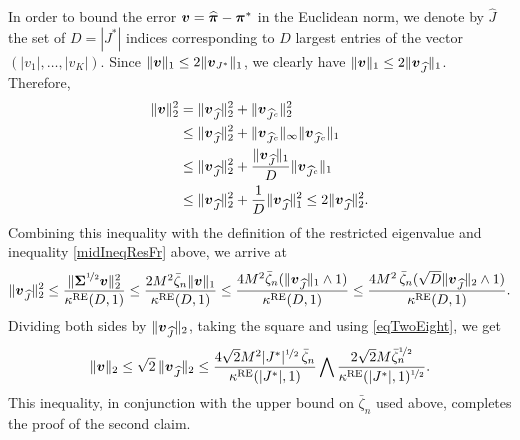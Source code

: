 In order to bound the error $\boldsymbol v=\widehat{\boldsymbol \pi}-\boldsymbol \pi^*$ in the Euclidean norm, we denote
by $\hat J $ the set of $D = |J^*|$ indices corresponding to $D$ largest entries of the
vector $(|v_1|,\ldots,|v_K|)$. Since $\|\boldsymbol v\|_1\le 2\|\boldsymbol v_{J^*}\|_1$, we clearly have
$\|\boldsymbol v\|_1\le 2\|\boldsymbol v_{\widehat J}\|_1$. Therefore,
\begin{align}
\|\boldsymbol v\|_2^2
&= \|\boldsymbol v_{\widehat J}\|_2^2+\|\boldsymbol v_{\widehat J^c}\|_2^2\\
&\le \|\boldsymbol v_{\widehat J}\|_2^2+\|\boldsymbol v_{\widehat J^c}\|_\infty\|\boldsymbol v_{\widehat J^c}\|_1\\
&\le \|\boldsymbol v_{\widehat J}\|_2^2+\frac{\|\boldsymbol v_{\widehat J}\|_1}{D}\|\boldsymbol v_{\widehat J^c}\|_1\\
&\le \|\boldsymbol v_{\widehat J}\|_2^2+\frac{1}{D}\|\boldsymbol v_{\widehat J}\|_1^2\le 2\|\boldsymbol v_{\widehat J}\|_2^2
\label{eqTwoEight}.
\end{align}
Combining this inequality with the definition of the restricted eigenvalue and
inequality \eqref{midIneqResFr} above, we arrive at
\begin{align}
\|\boldsymbol v_{\widehat J}\|_2^2\le \frac{\|\boldsymbol\Sigma^{\nicefrac12}\boldsymbol v\|_2^2}{\kappa^{\rm RE}(D,1)}
\le  \frac{2M^2\bar\zeta_n\|\boldsymbol v\|_1}{\kappa^{\rm RE}(D,1)}
\le  \frac{4M^2\bar\zeta_n(\|\boldsymbol v_{\widehat J}\|_1\wedge 1)}{\kappa^{\rm RE}(D,1)}
\le  \frac{4M^2\,\bar\zeta_n(\sqrt{D}\|\boldsymbol v_{\widehat J}\|_2\wedge 1)}{\kappa^{\rm RE}(D,1)}.
\end{align}
Dividing both sides by $\|\boldsymbol v_{\widehat J}\|_2$, taking the square and using \eqref{eqTwoEight},
we get
\begin{align}
\|\boldsymbol v\|_2\le \sqrt2\,\|\boldsymbol v_{\widehat J}\|_2
\le  \frac{ 4 \sqrt2 M^2 |J^*|^{\nicefrac12}\,\bar\zeta_n}{\kappa^{\rm RE}(|J^*|,1)}\bigwedge
\frac{2\sqrt2 M \bar\zeta_n^{\nicefrac12}}{\kappa^{\rm RE}(|J^*|,1)^{\nicefrac12}}.
\end{align}
This inequality, in conjunction with the upper bound on $\bar\zeta_n$ used above,
completes the proof of the second claim.




